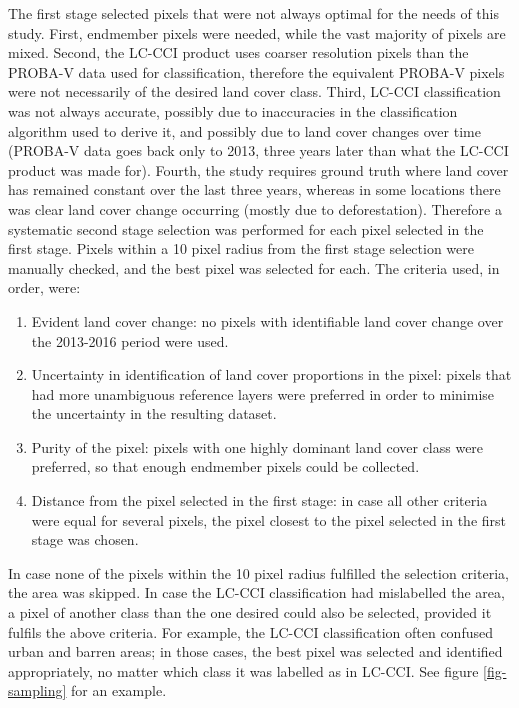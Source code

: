 \documentclass[a4paper,12pt]{scrbook}
\begin{document}

The first stage selected pixels that were not always optimal for the needs of this study. First, endmember pixels were needed, while the vast majority of pixels are mixed. Second, the LC-CCI product uses coarser resolution pixels than the PROBA-V data used for classification, therefore the equivalent PROBA-V pixels were not necessarily of the desired land cover class. Third, LC-CCI classification was not always accurate, possibly due to inaccuracies in the classification algorithm used to derive it, and possibly due to land cover changes over time (PROBA-V data goes back only to 2013, three years later than what the LC-CCI product was made for). Fourth, the study requires ground truth where land cover has remained constant over the last three years, whereas in some locations there was clear land cover change occurring (mostly due to deforestation). Therefore a systematic second stage selection was performed for each pixel selected in the first stage. Pixels within a 10 pixel radius from the first stage selection were manually checked, and the best pixel was selected for each. The criteria used, in order, were:

\begin{enumerate}
 \item Evident land cover change: no pixels with identifiable land cover change over the 2013-2016 period were used.
 \item Uncertainty in identification of land cover proportions in the pixel: pixels that had more unambiguous reference layers were preferred in order to minimise the uncertainty in the resulting dataset.
 \item Purity of the pixel: pixels with one highly dominant land cover class were preferred, so that enough endmember pixels could be collected.
 \item Distance from the pixel selected in the first stage: in case all other criteria were equal for several pixels, the pixel closest to the pixel selected in the first stage was chosen.
\end{enumerate}

In case none of the pixels within the 10 pixel radius fulfilled the selection criteria, the area was skipped. In case the LC-CCI classification had mislabelled the area, a pixel of another class than the one desired could also be selected, provided it fulfils the above criteria. For example, the LC-CCI classification often confused urban and barren areas; in those cases, the best pixel was selected and identified appropriately, no matter which class it was labelled as in LC-CCI. See figure \ref{fig-sampling} for an example.
\end{document}
